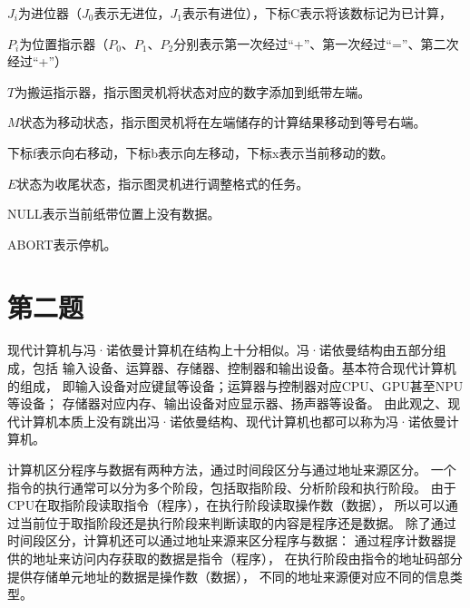\documentclass[UTF8]{ctexart}
\begin{document}
$J_{i}$为进位器（$J_{0}$表示无进位，$J_{1}$表示有进位），下标C表示将该数标记为已计算，

$P_{i}$为位置指示器（$P_{0}$、$P_{1}$、$P_{2}$分别表示第一次经过“+”、第一次经过“=”、第二次经过“+”）

$T$为搬运指示器，指示图灵机将状态对应的数字添加到纸带左端。

$M$状态为移动状态，指示图灵机将在左端储存的计算结果移动到等号右端。

下标f表示向右移动，下标b表示向左移动，下标x表示当前移动的数。

$E$状态为收尾状态，指示图灵机进行调整格式的任务。

NULL表示当前纸带位置上没有数据。

ABORT表示停机。

\section{第二题}

现代计算机与冯·诺依曼计算机在结构上十分相似。冯·诺依曼结构由五部分组成，包括
输入设备、运算器、存储器、控制器和输出设备。基本符合现代计算机的组成，
即输入设备对应键鼠等设备；运算器与控制器对应CPU、GPU甚至NPU等设备；
存储器对应内存、输出设备对应显示器、扬声器等设备。
由此观之、现代计算机本质上没有跳出冯·诺依曼结构、现代计算机也都可以称为冯·诺依曼计算机。

计算机区分程序与数据有两种方法，通过时间段区分与通过地址来源区分。
一个指令的执行通常可以分为多个阶段，包括取指阶段、分析阶段和执行阶段。
由于CPU在取指阶段读取指令（程序），在执行阶段读取操作数（数据），
所以可以通过当前位于取指阶段还是执行阶段来判断读取的内容是程序还是数据。
除了通过时间段区分，计算机还可以通过地址来源来区分程序与数据：
通过程序计数器提供的地址来访问内存获取的数据是指令（程序），
在执行阶段由指令的地址码部分提供存储单元地址的数据是操作数（数据），
不同的地址来源便对应不同的信息类型。
\end{document}
